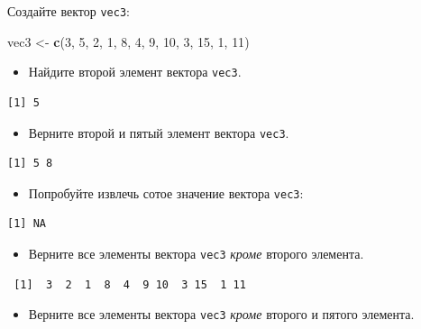 \documentclass[
]{book}
\newenvironment{Shaded}{\begin{snugshade}}{\end{snugshade}}
\newcommand{\DecValTok}[1]{\textcolor[rgb]{0.00,0.00,0.81}{#1}}
\newcommand{\KeywordTok}[1]{\textcolor[rgb]{0.13,0.29,0.53}{\textbf{#1}}}
\newcommand{\NormalTok}[1]{#1}
\newcommand{\StringTok}[1]{\textcolor[rgb]{0.31,0.60,0.02}{#1}}
\providecommand{\tightlist}{%
  \setlength{\itemsep}{0pt}\setlength{\parskip}{0pt}}
\begin{document}
Создайте вектор \texttt{vec3}:

\begin{Shaded}
\begin{Highlighting}[]
\NormalTok{vec3 <-}\StringTok{ }\KeywordTok{c}\NormalTok{(}\DecValTok{3}\NormalTok{, }\DecValTok{5}\NormalTok{, }\DecValTok{2}\NormalTok{, }\DecValTok{1}\NormalTok{, }\DecValTok{8}\NormalTok{, }\DecValTok{4}\NormalTok{, }\DecValTok{9}\NormalTok{, }\DecValTok{10}\NormalTok{, }\DecValTok{3}\NormalTok{, }\DecValTok{15}\NormalTok{, }\DecValTok{1}\NormalTok{, }\DecValTok{11}\NormalTok{)}
\end{Highlighting}
\end{Shaded}

\begin{itemize}
\tightlist
\item
  Найдите второй элемент вектора \texttt{vec3}.
\end{itemize}

\begin{verbatim}
[1] 5
\end{verbatim}

\begin{itemize}
\tightlist
\item
  Верните второй и пятый элемент вектора \texttt{vec3}.
\end{itemize}

\begin{verbatim}
[1] 5 8
\end{verbatim}

\begin{itemize}
\tightlist
\item
  Попробуйте извлечь сотое значение вектора \texttt{vec3}:
\end{itemize}

\begin{verbatim}
[1] NA
\end{verbatim}

\begin{itemize}
\tightlist
\item
  Верните все элементы вектора \texttt{vec3} \emph{кроме} второго элемента.
\end{itemize}

\begin{verbatim}
 [1]  3  2  1  8  4  9 10  3 15  1 11
\end{verbatim}

\begin{itemize}
\tightlist
\item
  Верните все элементы вектора \texttt{vec3} \emph{кроме} второго и пятого элемента.
\end{itemize}
\end{document}
